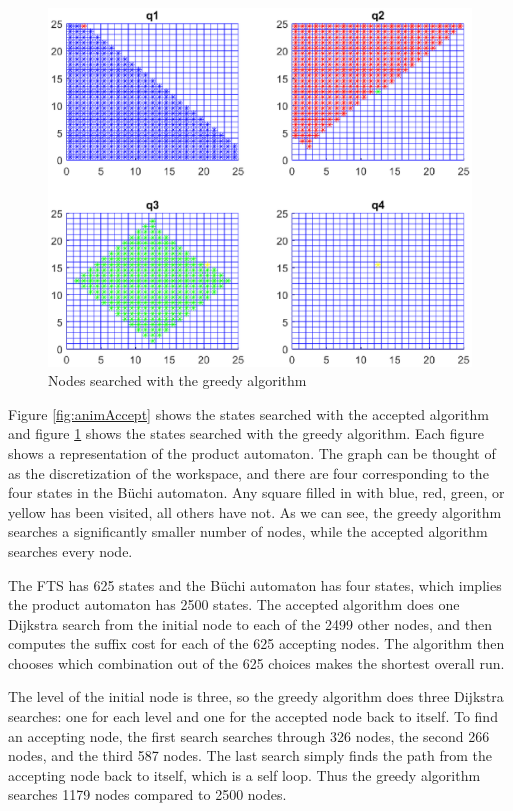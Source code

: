\begin{figure}[!htb]
\centering
\includegraphics[scale=0.7]{ourPlot}
\caption{Nodes searched with the greedy algorithm}
\label{fig:animOur}
\end{figure}

Figure \ref{fig:animAccept} shows the states searched with the accepted algorithm and figure \ref{fig:animOur} shows the states searched with the greedy algorithm. Each figure shows a representation of the product automaton. The graph can be thought of as the discretization of the workspace, and there are four corresponding to the four states in the B\"uchi automaton. Any square filled in with blue, red, green, or yellow has been visited, all others have not. As we can see, the greedy algorithm searches a significantly smaller number of nodes, while the accepted algorithm searches every node.

The FTS has 625 states and the B\"uchi automaton has four states, which implies the product automaton has 2500 states. The accepted algorithm does one Dijkstra search from the initial node to each of the 2499 other nodes, and then computes the suffix cost for each of the 625 accepting nodes. The algorithm then chooses which combination out of the 625 choices makes the shortest overall run. 

The level of the initial node is three, so the greedy algorithm does three Dijkstra searches: one for each level and one for the accepted node back to itself. To find an accepting node, the first search searches through 326 nodes, the second 266 nodes, and the third 587 nodes. The last search simply finds the path from the accepting node back to itself, which is a self loop. Thus the greedy algorithm searches 1179 nodes compared to 2500 nodes.  

